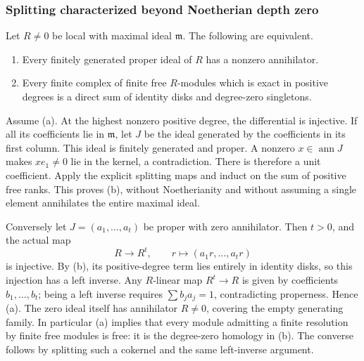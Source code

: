 \subsubsection{Splitting characterized beyond Noetherian depth zero}\label{splitting-characterized-beyond-noetherian-depth-zero}

Let \(R\ne0\) be local with maximal ideal \(\mathfrak m\). The following are equivalent.

\begin{enumerate}
\def\labelenumi{(\alph{enumi})}
\item
  Every finitely generated proper ideal of \(R\) has a nonzero annihilator.
\item
  Every finite complex of finite free \(R\)-modules which is exact in positive degrees is a direct sum of identity disks and degree-zero singletons.
\end{enumerate}

Assume (a). At the highest nonzero positive degree, the differential is injective. If all its coefficients lie in \(\mathfrak m\), let \(J\) be the ideal generated by the coefficients in its first column. This ideal is finitely generated and proper. A nonzero \(x\in\operatorname{ann}J\) makes \(xe_1\ne0\) lie in the kernel, a contradiction. There is therefore a unit coefficient. Apply the explicit splitting maps and induct on the sum of positive free ranks. This proves (b), without Noetherianity and without assuming a single element annihilates the entire maximal ideal.

Conversely let \(J=(a_1,\ldots,a_t)\) be proper with zero annihilator. Then \(t>0\), and the actual map \[
 R\longrightarrow R^t,\qquad r\longmapsto(a_1r,\ldots,a_tr)
\] is injective. By (b), its positive-degree term lies entirely in identity disks, so this injection has a left inverse. Any \(R\)-linear map \(R^t\to R\) is given by coefficients \(b_1,\ldots,b_t\); being a left inverse requires \(\sum b_ja_j=1\), contradicting properness. Hence (a). The zero ideal itself has annihilator \(R\ne0\), covering the empty generating family. In particular (a) implies that every module admitting a finite resolution by finite free modules is free: it is the degree-zero homology in (b). The converse follows by splitting such a cokernel and the same left-inverse argument.

